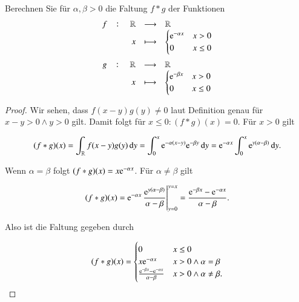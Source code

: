 
\begin{exercise}
  Berechnen Sie für $\alpha,\beta>0$ die Faltung $f \ast g$ der Funktionen
  \begin{equation*}
    \fullfunction{f}{\R}{\R}{x}{
      \begin{cases}
        \e^{-\alpha x} & x>0\\
        0 & x \leq 0\\
    \end{cases}}
  \end{equation*}
  \begin{equation*}
    \fullfunction{g}{\R}{\R}{x}{
      \begin{cases}
        \e^{-\beta x} & x>0\\
        0 & x \leq 0\\
    \end{cases}}
  \end{equation*}
\end{exercise}
\begin{proof}
  Wir sehen, dass $f(x-y)g(y) \neq 0$ laut Definition genau für $x-y>0 \land y>0$ gilt. Damit folgt für $x \leq 0: (f \ast g)(x)=0$. Für $x>0$ gilt

  \begin{equation*}
    (f \ast g)(x) = \int_\R{f(x-y)g(y) \dif y}
    =\int_0^x{\e^{-\alpha (x-y)}\e^{-\beta y} \dif y}
    = \e^{-\alpha x}\int_0^x{\e^{y(\alpha - \beta)} \dif y}.
  \end{equation*}

  Wenn $\alpha=\beta$ folgt $(f \ast g)(x)=x\mathrm{e}^{-\alpha x}$. Für $\alpha \neq \beta$ gilt

  \begin{equation*}
    (f \ast g)(x)=\e^{-\alpha x}\eval{\frac{\e^{y(\alpha - \beta)}}{\alpha - \beta}}_{y=0}^{y=x}
    = \frac{\e^{-\beta x} - \e^{-\alpha x}}{\alpha - \beta}.
  \end{equation*}

  Also ist die Faltung gegeben durch

  \begin{equation*}
    (f \ast g)(x)=
    \begin{cases}
      0 & x \leq 0 \\
      x\mathrm{e}^{-\alpha x} & x>0 \land \alpha=\beta \\
      \frac{\mathrm{e}^{-\beta x} - \mathrm{e}^{-\alpha x}}{\alpha - \beta} & x>0 \land \alpha \neq \beta. \\
    \end{cases}
  \end{equation*}
\end{proof}
